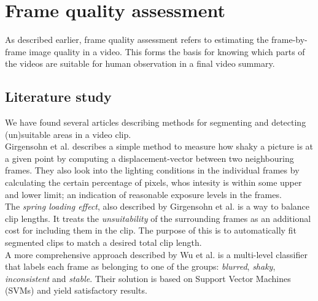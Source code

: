 %
\section{Frame quality assessment}
%
As described earlier, frame quality assessment refers to estimating the frame-by-frame image quality in a video. This forms the basis for knowing which parts of the videos are suitable for human observation in a final video summary.
%
\subsection{Literature study}
We have found several articles describing methods for segmenting and detecting (un)suitable areas in a video clip.\\
Girgensohn et al. \cite{Girgensohn:2000:SAH:354401.354415} describes a simple method to measure how shaky a picture is at a given point by computing a displacement-vector between two neighbouring frames. They also look into the lighting conditions in the individual frames by calculating the certain percentage of pixels, whos intesity is within some upper and lower limit; an indication of reasonable exposure levels in the frames.\\
The \textit{spring loading effect}\cite{Girgensohn:2000:SAH:354401.354415}, also described by Girgensohn et al. is a way to balance clip lengths. It treats the \textit{unsuitability} of the surrounding frames as an additional cost for including them in the clip. The purpose of this is to automatically fit segmented clips to match a desired total clip length.\\
%
A more comprehensive approach described by Wu et al. \cite{10.1109/ICME.2005.1521399} is a multi-level classifier that labels each frame as belonging to one of the groups: \textit{blurred}, \textit{shaky}, \textit{inconsistent} and \textit{stable}. Their solution is based on Support Vector Machines (SVMs) and yield satisfactory results.
%
